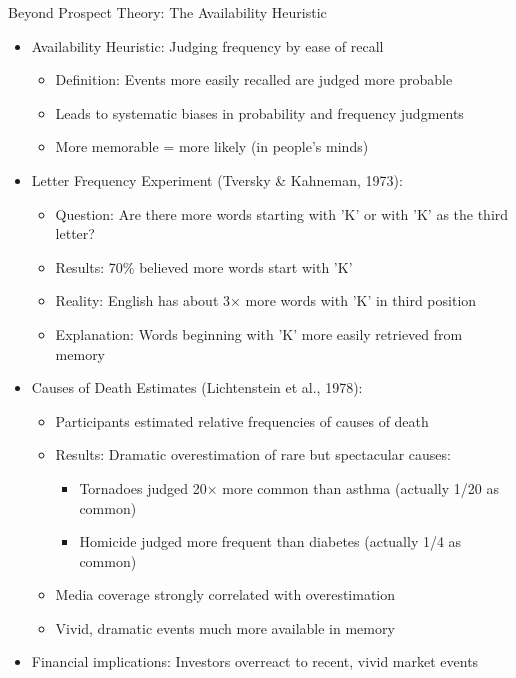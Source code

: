 \documentclass[10pt]{beamer}
\begin{document}
\begin{frame}{Beyond Prospect Theory: The Availability Heuristic}
  \begin{itemize}[<+->]
    \item Availability Heuristic: Judging frequency by ease of recall
      \begin{itemize}
        \item Definition: Events more easily recalled are judged more probable
        \item Leads to systematic biases in probability and frequency judgments
        \item More memorable = more likely (in people's minds)
      \end{itemize}
    \item Letter Frequency Experiment (Tversky \& Kahneman, 1973):
      \begin{itemize}
        \item Question: Are there more words starting with 'K' or with 'K' as the third letter?
        \item Results: 70\% believed more words start with 'K'
        \item Reality: English has about 3× more words with 'K' in third position
        \item Explanation: Words beginning with 'K' more easily retrieved from memory
      \end{itemize}
    \item Causes of Death Estimates (Lichtenstein et al., 1978):
      \begin{itemize}
        \item Participants estimated relative frequencies of causes of death
        \item Results: Dramatic overestimation of rare but spectacular causes:
          \begin{itemize}
            \item Tornadoes judged 20× more common than asthma (actually 1/20 as common)
            \item Homicide judged more frequent than diabetes (actually 1/4 as common)
          \end{itemize}
        \item Media coverage strongly correlated with overestimation
        \item Vivid, dramatic events much more available in memory
      \end{itemize}
    \item Financial implications: Investors overreact to recent, vivid market events
  \end{itemize}
\end{frame}
\end{document}
